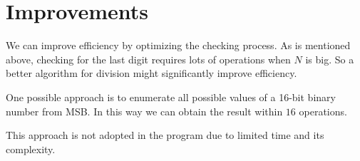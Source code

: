 \documentclass[UTF8]{ctexart}
\begin{document}
\section{Improvements}
We can improve efficiency by optimizing the checking process. 
As is mentioned above, checking for the last digit requires 
lots of operations when $N$ is big. So a better algorithm
for division might significantly improve efficiency.

One possible approach is to enumerate all possible values of a 16-bit 
binary number from MSB. In this way we can obtain the result within 
$16$ operations.

This approach is not adopted in the program due to limited time and its complexity.


\end{document}
